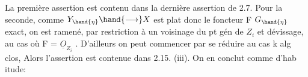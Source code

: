 La première assertion est contenu dans la dernière assertion de
2.7. Pour la seconde, comme  $Y_{\hand{\eta}} \hand{\longrightarrow} X$ est plat donc le foncteur F \hand{$\rightsquigarrow$} $G_{\hand{\eta}}$
exact,  on est ramené, par restriction à un voisinage du pt gén de $Z_i$
et dévissage, au cas où F = $\underline{O}_{Z_i}$  . D'ailleurs on peut commencer par
se réduire au cas k alg clos,  Alors  l'assertion  est
contenue dans 2.15. (iii).   On en conclut comme d'hab itude:

